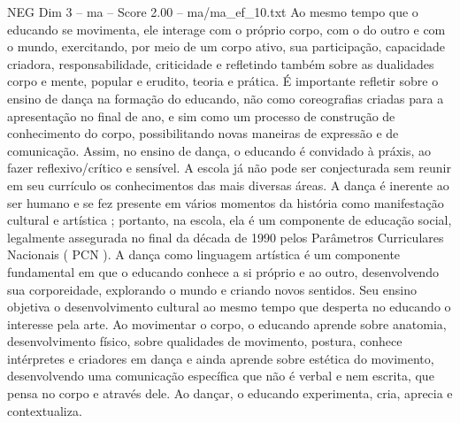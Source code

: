\begin{textsample}{NEG Dim 3 – ma – Score 2.00 – ma/ma\_ef\_10.txt}
Ao mesmo tempo que o educando se movimenta, ele interage com o próprio corpo, com o do outro e com o mundo, exercitando, por meio de um corpo ativo, sua participação, capacidade criadora, responsabilidade, criticidade e refletindo também sobre as dualidades corpo e mente, popular e erudito, teoria e prática.
É importante refletir sobre o ensino de dança na formação do educando, não como coreografias criadas para a apresentação no final de ano, e sim como um processo de construção de conhecimento do corpo, possibilitando novas maneiras de expressão e de comunicação.
Assim, no ensino de dança, o educando é convidado à práxis, ao fazer reflexivo/crítico e sensível.
A escola já não pode ser conjecturada sem reunir em seu currículo os conhecimentos das mais diversas áreas.
A dança é inerente ao ser humano e se fez presente em vários momentos da história como manifestação cultural e artística ; portanto, na escola, ela é um componente de educação social, legalmente assegurada no final da década de 1990 pelos Parâmetros Curriculares Nacionais ( PCN ).
A dança como linguagem artística é um componente fundamental em que o educando conhece a si próprio e ao outro, desenvolvendo sua corporeidade, explorando o mundo e criando novos sentidos.
Seu ensino objetiva o desenvolvimento cultural ao mesmo tempo que desperta no educando o interesse pela arte.
Ao movimentar o corpo, o educando aprende sobre anatomia, desenvolvimento físico, sobre qualidades de movimento, postura, conhece intérpretes e criadores em dança e ainda aprende sobre estética do movimento, desenvolvendo uma comunicação específica que não é verbal e nem escrita, que pensa no corpo e através dele.
Ao dançar, o educando experimenta, cria, aprecia e contextualiza.

\end{textsample}
